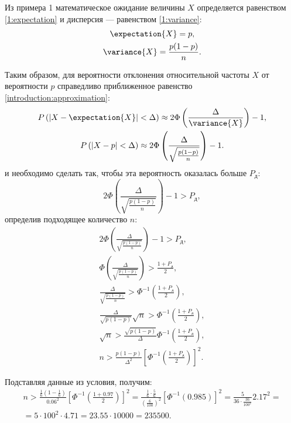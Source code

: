 \documentclass[a4paper,12pt]{article}
\begin{document}
    Из примера 1 математическое ожидание величины $X$ определяется равенством \eqref{1:expectation} и дисперсия --- равенством \eqref{1:variance}:
    \begin{gather}
        \expectation{X} = p, \\
        \variance{X} = \frac{p ( 1 - p )}{n} .
    \end{gather}

    Таким образом, для вероятности отклонения относительной частоты $X$ от вероятности $p$ справедливо приближенное равенство \eqref{introduction:approximation}:
    \begin{gather}
        \probability{\modulus{X - \expectation{X}} < \Delta} \approx 2 \Phi \left ( \frac{\Delta}{\variance{X}} \right ) - 1 , \\
        \probability{\modulus{X - p} < \Delta} \approx 2 \Phi \left ( \frac{\Delta}{\sqrt{\frac{p(1-p)}{n}}} \right ) - 1 .
    \end{gather}
    и необходимо сделать так, чтобы эта вероятность оказалась больше $P_\text{д}$:
    \begin{equation}
        2 \Phi \left ( \frac{\Delta}{\sqrt{\frac{p(1-p)}{n}}} \right ) - 1 > P_\text{д} ,
    \end{equation}
    определив подходящее количество $n$:
    \begin{gather}
        2 \Phi \left ( \frac{\Delta}{\sqrt{\frac{p(1-p)}{n}}} \right ) - 1 > P_\text{д} , \\
        \Phi \left ( \frac{\Delta}{\sqrt{\frac{p(1-p)}{n}}} \right ) > \frac{1 + P_\text{д}}{2} , \\
        \frac{\Delta}{\sqrt{\frac{p(1-p)}{n}}} > \Phi^{-1} \left ( \frac{1 + P_\text{д}}{2} \right ) , \\
        \frac{\Delta}{\sqrt{p(1-p)}} \sqrt{n} > \Phi^{-1} \left ( \frac{1 + P_\text{д}}{2} \right ) , \\
        \sqrt{n} > \frac{\sqrt{p(1-p)}}{\Delta} \Phi^{-1} \left ( \frac{1 + P_\text{д}}{2} \right ) , \\
        n > \frac{p(1-p)}{\Delta^2} \left [ \Phi^{-1} \left ( \frac{1 + P_\text{д}}{2} \right ) \right ]^2 .
    \end{gather}

    Подставляя данные из условия, получим:
    \begin{multline}
        n >
        \frac{\frac{1}{6} \left ( 1 - \frac{1}{6} \right )}{0.06^2} \left [ \Phi^{-1} \left ( \frac{1 + 0.97}{2} \right ) \right ]^2
        = \frac{\frac{1}{6} \cdot \frac{5}{6}}{\left ( \frac{6}{100} \right )^2} \left [ \Phi^{-1} \left ( 0.985 \right ) \right ]^2
        = \frac{5}{36 \cdot \frac{36}{100^2}} 2.17^2 = \\
        = 5 \cdot 100^2 \cdot 4.71
        = 23.55 \cdot 10000
        = 235500 .
    \end{multline}
\end{document}
